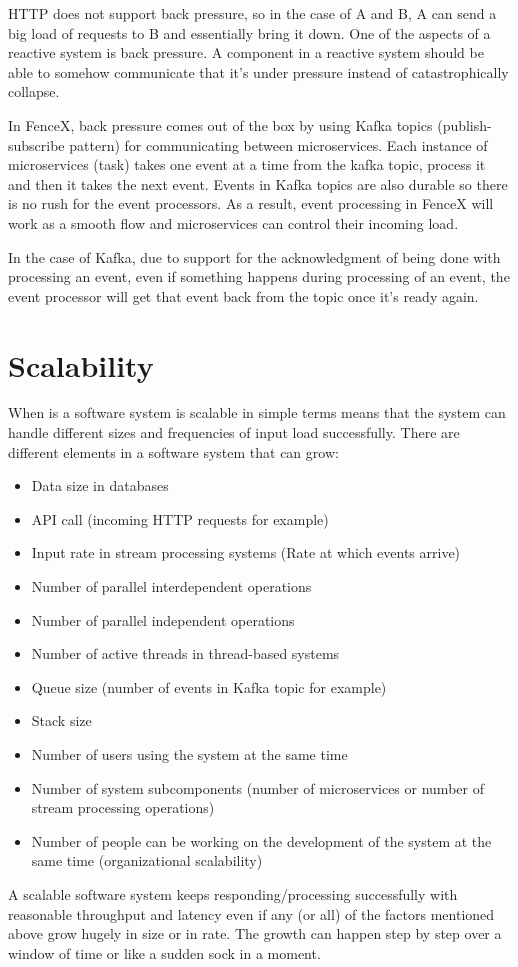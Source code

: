 \documentclass[a4]{report}
\begin{document}
    HTTP does not support back pressure, so in the case of A and B, A can send a big load of requests to B and
    essentially bring it down.
    One of the aspects of a reactive system is back pressure.
    A component in a reactive system should be able to somehow communicate that it's under pressure instead of catastrophically collapse.

    In FenceX, back pressure comes out of the box by using Kafka topics (publish-subscribe pattern) for communicating
    between microservices.
    Each instance of microservices (task) takes one event at a time from the kafka topic, process it and then it takes
    the next event.
    Events in Kafka topics are also durable so there is no rush for the event processors.
    As a result, event processing in FenceX will work as a smooth flow and microservices can control their incoming load.

    In the case of Kafka, due to support for the acknowledgment of being done with processing an event, even if
    something happens during processing of an event, the event processor will get that event back from the topic once it's
    ready again.


    \section{Scalability}
    When is a software system is scalable in simple terms means that the system can handle different sizes and frequencies of
    input load successfully.
    There are different elements in a software system that can grow:
    \begin{itemize}
        \item Data size in databases
        \item API call (incoming HTTP requests for example)
        \item Input rate in stream processing systems (Rate at which events arrive)
        \item Number of parallel interdependent operations
        \item Number of parallel independent operations
        \item Number of active threads in thread-based systems
        \item Queue size (number of events in Kafka topic for example)
        \item Stack size
        \item Number of users using the system at the same time
        \item Number of system subcomponents (number of microservices or number of stream processing operations)
        \item Number of people can be working on the development of the system at the same time (organizational scalability)
    \end{itemize}
    A scalable software system keeps responding/processing successfully with reasonable throughput and latency even if
    any (or all) of the factors mentioned above grow hugely in size or in rate.
    The growth can happen step by step over a window of time or like a sudden sock in a moment.
\end{document}
